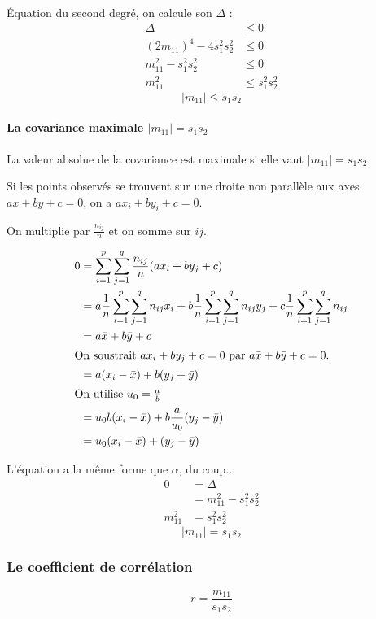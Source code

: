 Équation du second degré, on calcule son $\Delta$ :
\begin{align*}
	\Delta &\leq 0\\
	(2 m_{11})^4 - 4 s_1^2 s_2^2 &\leq 0\\
	m_{11}^2 - s_1^2 s_2^2 &\leq 0\\
	m_{11}^2 &\leq s_1^2 s_2^2
\end{align*}
$$\boxed{|m_{11}| \leq s_1 s_2}$$




\paragraph{La covariance maximale $|m_{11}| = s_1s_2$}

La valeur absolue de la covariance est maximale si elle vaut $|m_{11}| = s_1s_2$.

Si les points observés se trouvent sur une droite non parallèle aux axes $ax+by+c=0$, on a $ax_i+by_i+c=0$.

On multiplie par $\frac{n_{ij}}{n}$ et on somme sur $ij$.

\begin{align*}
0  &= \sum_{i=1}^{p} \sum_{j=1}^{q} \frac{n_{ij}}{n}(ax_i+by_j+c) \\
   &= a \frac{1}{n} \sum_{i=1}^{p} \sum_{j=1}^{q}n_{ij}x_i + b \frac{1}{n} \sum_{i=1}^{p} \sum_{j=1}^{q}n_{ij}y_j + c \frac{1}{n} \sum_{i=1}^{p} \sum_{j=1}^{q}n_{ij}\\
   &= a\bar{x}+b\bar{y}+c\\
\intertext{On soustrait $ax_i+by_j+c=0$ par $a\bar{x}+b\bar{y}+c = 0$.}
   &= a(x_i-\bar{x})+b(y_j+\bar{y})\\
\intertext{On utilise $u_0=\frac{a}{b}$}
   &= u_0b(x_i-\bar{x})+b\frac{a}{u_0}(y_j-\bar{y})\\
   &= u_0(x_i-\bar{x})+(y_j-\bar{y})
\end{align*}

L'équation a la même forme que $\alpha$, du coup...
\begin{align*}
	0        &= \Delta\\
	         &= m_{11}^2-s_1^2s_2^2\\
	m_{11}^2 &= s_1^2s_2^2
\end{align*}
$$\boxed{|m_{11}| = s_1s_2}$$









\subsubsection{Le coefficient de corrélation}
$$\boxed{r=\frac{m_{11}}{s_1s_2}}$$
